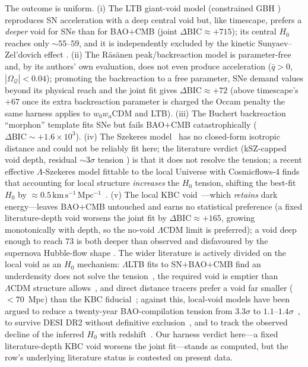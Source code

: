 \documentclass[aps,prd,twocolumn,nofootinbib,superscriptaddress,floatfix]{revtex4-2}
\newcommand{\Ho}{H_{0}}
\newcommand{\kmsmpc}{\,\mathrm{km\,s^{-1}\,Mpc^{-1}}}
\newcommand{\Lcdm}{\Lambda\mathrm{CDM}}
\newcommand{\dBIC}{\Delta\mathrm{BIC}}
\begin{document}
The outcome is uniform. (i) The LTB giant-void model (constrained GBH
\cite{GBH2008}) reproduces SN acceleration with a deep central void but, like
timescape, prefers a \emph{deeper} void for SNe than for BAO$+$CMB (joint
$\dBIC\approx+715$); its central $\Ho$ reaches only $\sim\!55$--$59$, and it is
independently excluded by the kinetic Sunyaev--Zel'dovich effect
\cite{ZhangStebbins2011,Camarena2022}. (ii) The R\"as\"anen peak/backreaction model
\cite{Rasanen2008,Rasanen2009} is parameter-free and, by its authors' own
evaluation, does not even produce acceleration ($\bar q>0$,
$|\Omega_{\mathcal Q}|<0.04$); promoting the backreaction to a free parameter, SNe
demand values beyond its physical reach and the joint fit gives
$\dBIC\approx+72$ (above timescape's $+67$ once its extra backreaction parameter
is charged the Occam penalty the same harness applies to $w_0w_a$CDM and LTB). (iii) The Buchert backreaction ``morphon'' template
\cite{Larena2009} fits SNe but fails BAO$+$CMB catastrophically
($\dBIC\sim+1.6\times10^3$). (iv) The Szekeres model~\cite{MeuresBruni2011} has no
closed-form isotropic distance and could not be reliably fit here; the literature
verdict (kSZ-capped void depth, residual $\sim\!3\sigma$ tension
\cite{Camarena2022}) is that it does not resolve the tension; a recent effective
$\Lambda$-Szekeres model fittable to the local Universe with Cosmicflows-4 finds that
accounting for local structure \emph{increases} the $\Ho$ tension, shifting the best-fit
$\Ho$ by $\approx0.5\kmsmpc$~\cite{GaloppoSzekeres2025}. (v) The local KBC
void~\cite{KBC2013,Haslbauer2020}---which \emph{retains} dark energy---leaves
BAO$+$CMB untouched and earns no statistical preference (a fixed literature-depth
void worsens the joint fit by $\dBIC\approx+165$, growing monotonically with
depth, so the no-void $\Lcdm$ limit is preferred); a void deep enough to reach
$73$ is both deeper than observed
and disfavoured by the supernova Hubble-flow shape
\cite{Kenworthy2019,Camarena2022}. The wider literature is actively divided on the local
void as an $\Ho$ mechanism: $\Lambda$LTB fits to SN$+$BAO$+$CMB find an underdensity does
not solve the tension~\cite{Castello2022}, the required void is emptier than $\Lcdm$
structure allows~\cite{Huterer2023}, and direct distance tracers prefer a void far
smaller ($<70$~Mpc) than the KBC fiducial~\cite{Stiskalek2025}; against this, local-void
models have been argued to reduce a twenty-year BAO-compilation tension from $3.3\sigma$
to $1.1$--$1.4\sigma$~\cite{BanikBAO2025}, to survive DESI DR2 without definitive
exclusion~\cite{BanikDESI2026}, and to track the observed decline of the inferred $\Ho$
with redshift~\cite{Mazurenko2025}. Our harness verdict here---a fixed literature-depth
KBC void worsens the joint fit---stands as computed, but the row's underlying literature
status is contested on present data.
\end{document}
